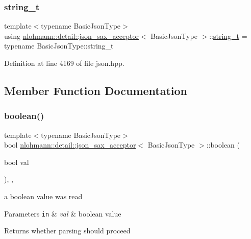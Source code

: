 \subsubsection{\texorpdfstring{string\+\_\+t}{string\_t}}
{\footnotesize\ttfamily template$<$typename Basic\+Json\+Type$>$ \\
using \hyperlink{classnlohmann_1_1detail_1_1json__sax__acceptor}{nlohmann\+::detail\+::json\+\_\+sax\+\_\+acceptor}$<$ Basic\+Json\+Type $>$\+::\hyperlink{structnlohmann_1_1json__sax_ae01977a9f3c5b3667b7a2929ed91061e}{string\+\_\+t} =  typename Basic\+Json\+Type\+::string\+\_\+t}



Definition at line 4169 of file json.\+hpp.



\subsection{Member Function Documentation}
\mbox{\label{classnlohmann_1_1detail_1_1json__sax__acceptor_ac629bf4f75f489f101d9cd08ffb21d90}} 
\subsubsection{\texorpdfstring{boolean()}{boolean()}}
{\footnotesize\ttfamily template$<$typename Basic\+Json\+Type$>$ \\
bool \hyperlink{classnlohmann_1_1detail_1_1json__sax__acceptor}{nlohmann\+::detail\+::json\+\_\+sax\+\_\+acceptor}$<$ Basic\+Json\+Type $>$\+::boolean (\begin{DoxyParamCaption}\item[{bool}]{val }\end{DoxyParamCaption})\hspace{0.3cm}{\ttfamily [inline]}, {\ttfamily [override]}, {\ttfamily [virtual]}}



a boolean value was read 


\begin{DoxyParams}[1]{Parameters}
\mbox{\tt in}  & {\em val} & boolean value \\
\hline
\end{DoxyParams}
\begin{DoxyReturn}{Returns}
whether parsing should proceed 
\end{DoxyReturn}


